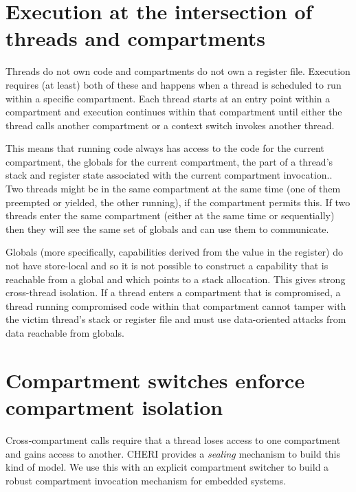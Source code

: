 \section{Execution at the intersection of threads and compartments}

Threads do not own code and compartments do not own a register file.
Execution requires (at least) both of these and happens when a thread is scheduled to run within a specific compartment.
Each thread starts at an entry point within a compartment and execution continues within that compartment until either the thread calls another compartment or a context switch invokes another thread.

This means that running code always has access to the code for the current compartment, the globals for the current compartment, the part of a thread's stack and register state associated with the current compartment invocation..
Two threads might be in the same compartment at the same time (one of them preempted or yielded, the other running), if the compartment permits this.
If two threads enter the same compartment (either at the same time or sequentially) then they will see the same set of globals and can use them to communicate.

Globals (more specifically, capabilities derived from the value in the \CGP{} register) do not have store-local and so it is not possible to construct a capability that is reachable from a global and which points to a stack allocation.
This gives strong cross-thread isolation.
If a thread enters a compartment that is compromised, a thread running compromised code within that compartment cannot tamper with the victim thread's stack or register file and must use data-oriented attacks from data reachable from globals.

\section{Compartment switches enforce compartment isolation}

Cross-compartment calls require that a thread loses access to one compartment and gains access to another.
CHERI provides a \textit{sealing} mechanism to build this kind of model.
We use this with an explicit compartment switcher to build a robust compartment invocation mechanism for embedded systems.

